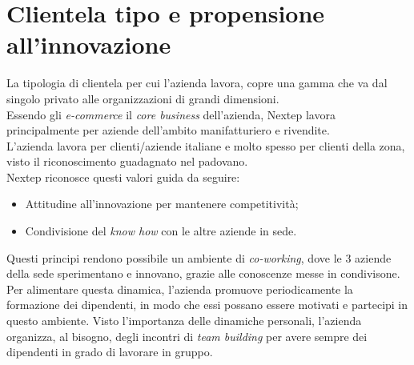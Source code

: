 \section{Clientela tipo e propensione all’innovazione}
La tipologia di clientela per cui l'azienda lavora, copre una gamma che va dal singolo privato alle organizzazioni di grandi dimensioni.\\Essendo gli \emph{e-commerce} il \emph{core business} dell'azienda, Nextep lavora principalmente per aziende dell'ambito manifatturiero e rivendite.\\L'azienda lavora per clienti/aziende italiane e molto spesso per clienti della zona, visto il riconoscimento guadagnato nel padovano.\\Nextep riconosce questi valori guida da seguire:
\begin{itemize}
\item Attitudine all'innovazione per mantenere competitività;
\item Condivisione del \emph{know how} con le altre aziende in sede.
\end{itemize}
Questi principi rendono possibile un ambiente di \emph{co-working}, dove le 3 aziende della sede sperimentano e innovano, grazie alle conoscenze messe in condivisone. Per alimentare questa dinamica, l'azienda promuove periodicamente la formazione dei dipendenti, in modo che essi possano essere motivati e partecipi in questo ambiente. Visto l'importanza delle dinamiche personali, l'azienda organizza, al bisogno, degli incontri di \emph{team building} per avere sempre dei dipendenti in grado di lavorare in gruppo.  
